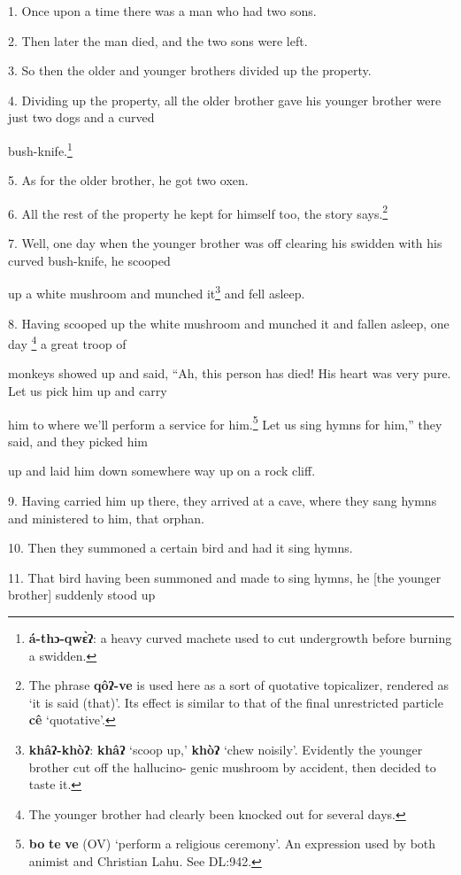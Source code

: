 \setcounter{footnote}{0}

1. Once upon a time there was a man who had two sons.

2. Then later the man died, and the two sons were left.

3. So then the older and younger brothers divided up the property.

4. Dividing up the property, all the older brother gave his younger brother were
just two dogs and a curved

bush-knife.\footnote{\textbf{á-thɔ-qwɛ̀ʔ}: a heavy curved machete used to cut undergrowth before burning a swidden.}

5. As for the older brother, he got two oxen.

6. All the rest of the property he kept for himself too, the story says.\footnote{The phrase \textbf{qôʔ-ve} is used here as a sort of quotative topicalizer, rendered as `it is said (that)'. Its effect is similar to that of the final unrestricted particle \textbf{cê} `quotative'.}

7. Well, one day when the younger brother was off clearing his swidden with his
curved bush-knife, he scooped

up a white mushroom and munched it\footnote{\textbf{khâʔ-khòʔ}: \textbf{khâʔ} `scoop up,' \textbf{khòʔ} `chew noisily'. Evidently the younger brother cut off the hallucino- genic mushroom by accident, then decided to taste it.} and fell asleep.

8. Having scooped up the white mushroom and munched it and fallen asleep, one day
\footnote{The younger brother had clearly been knocked out for several days.} a great troop of

monkeys showed up and said, ``Ah, this person has died! His heart was very pure.
Let us pick him up and carry

him to where we'll perform a service for him.\footnote{\textbf{bo} \textbf{te} \textbf{ve} (OV) `perform a religious ceremony'. An expression used by both animist and Christian Lahu. See DL:942.} Let us sing hymns for him,''
they said, and they picked him

up and laid him down somewhere way up on a rock cliff.

9. Having carried him up there, they arrived at a cave, where they sang hymns and
ministered to him, that orphan.

10. Then they summoned a certain bird and had it sing hymns.

11. That bird having been summoned and made to sing hymns, he [the younger brother]
suddenly stood up

